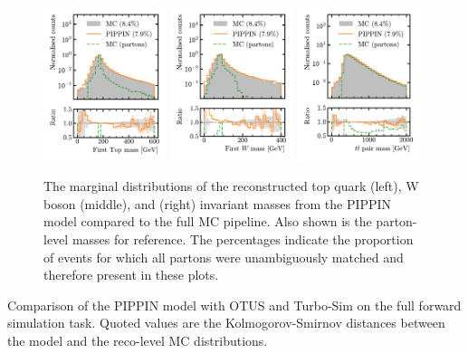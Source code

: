 \begin{figure}[htb]
    \centering
    \includegraphics[width=0.32\textwidth]{Figures/jet_generation/pippin/masses/mass_top1.pdf}
    \includegraphics[width=0.32\textwidth]{Figures/jet_generation/pippin/masses/mass_w1.pdf}
    \includegraphics[width=0.32\textwidth]{Figures/jet_generation/pippin/masses/mass_ttbar.pdf}
    \caption{
        The marginal distributions of the reconstructed top quark (left), W boson (middle), and \ttbar (right) invariant masses from the PIPPIN model compared to the full MC pipeline.
        Also shown is the parton-level masses for reference.
        The percentages indicate the proportion of events for which all partons were unambiguously matched and therefore present in these plots.
    }
    \label{fig:pippin_mass}
\end{figure}

\begin{table}[htb]
    \centering
    \renewcommand{\arraystretch}{1.5}
    \caption{Comparison of the PIPPIN model with OTUS and Turbo-Sim on the full forward simulation task. Quoted values are the Kolmogorov-Smirnov distances between the model and the reco-level MC distributions.}
    \label{tab:pippin}
    
\end{table}

